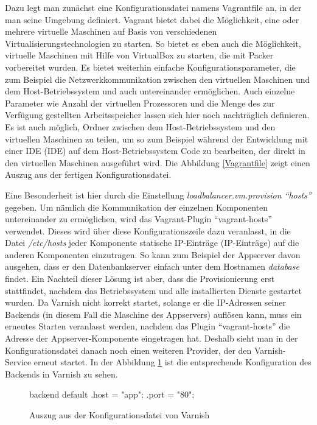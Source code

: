 Dazu legt man zunächst eine Konfigurationsdatei namens Vagrantfile an, in der man seine Umgebung definiert. Vagrant bietet dabei die Möglichkeit, eine oder mehrere virtuelle Maschinen auf Basis von verschiedenen Virtualisierungstechnologien zu starten. So bietet es eben auch die Möglichkeit, virtuelle Maschinen mit Hilfe von VirtualBox zu starten, die mit Packer vorbereitet wurden. Es bietet weiterhin einfache Konfigurationsparameter, die zum Beispiel die Netzwerkkommunikation zwischen den virtuellen Maschinen und dem Host-Betriebssystem und auch untereinander ermöglichen. Auch einzelne Parameter wie Anzahl der virtuellen Prozessoren und die Menge des zur Verfügung gestellten Arbeitsspeicher lassen sich hier noch nachträglich definieren. Es ist auch möglich, Ordner zwischen dem Host-Betriebssystem und den virtuellen Maschinen zu teilen, um so zum Beispiel während der Entwicklung mit einer IDE (\acl{IDE}) auf dem Host-Betriebssystem Code zu bearbeiten, der direkt in den virtuellen Maschinen ausgeführt wird. Die Abbildung \ref{Vagrantfile} zeigt einen Auszug aus der fertigen Konfigurationsdatei.

Eine Besonderheit ist hier durch die Einstellung \textit{loadbalancer.vm.provision "`hosts"'} gegeben. Um nämlich die Kommunikation der einzelnen Komponenten untereinander zu ermöglichen, wird das Vagrant-Plugin "`vagrant-hosts"' \citep[Vgl.][]{vagranthosts} verwendet. Dieses wird über diese Konfigurationszeile dazu veranlasst, in die Datei \textit{/etc/hosts} jeder Komponente statische IP-Einträge (\acl{IP}-Einträge) auf die anderen Komponenten einzutragen. So kann zum Beispiel der Appserver davon ausgehen, dass er den Datenbankserver einfach unter dem Hostnamen \textit{database} findet. Ein Nachteil dieser Lösung ist aber, dass die Provisionierung erst stattfindet, nachdem das Betriebssystem und alle installierten Dienste gestartet wurden. Da Varnish nicht korrekt startet, solange er die IP-Adressen seiner Backends (in diesem Fall die Maschine des Appservers) auflösen kann, muss ein erneutes Starten veranlasst werden, nachdem das Plugin "`vagrant-hosts"' die Adresse der Appserver-Komponente eingetragen hat. Deshalb sieht man in der Konfigurationsdatei danach noch einen weiteren Provider, der den Varnish-Service erneut startet. In der Abbildung \ref{varnishconf} ist die entsprechende Konfiguration des Backends in Varnish zu sehen.

\begin{figure}[!ht]
  \begin{center}
    \begin{yamlcode}
backend default {
    .host = "app";
    .port = "80";
}
    \end{yamlcode}
    \caption{Auszug aus der Konfigurationsdatei von Varnish}
    \label{varnishconf}
  \end{center}
\end{figure}


